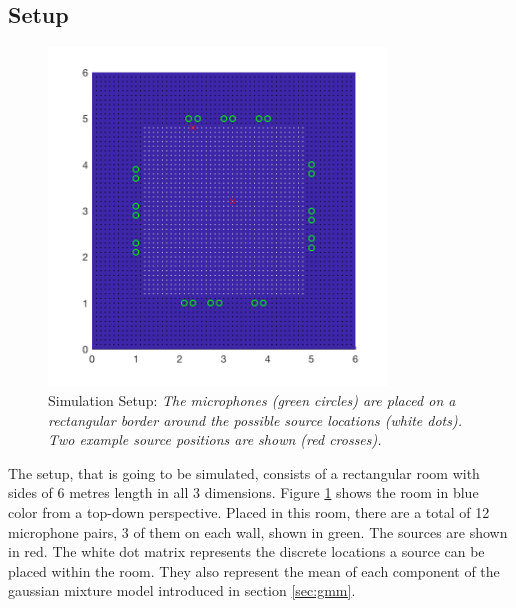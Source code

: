 \subsection{Setup}
\label{sec:setup}

\begin{figure}[H]
	\centering
	\includegraphics[width=0.8\textwidth]{data/plots/setup/setup.png}
	\caption[Simulation Setup]{Simulation Setup: \itshape The microphones (green circles) are placed on a rectangular border around the possible source locations (white dots). Two example source positions are shown (red crosses).}
	\label{fig:setup}
\end{figure}


The setup, that is going to be simulated, consists of a rectangular room with sides of 6 metres length in all 3 dimensions. Figure \ref{fig:setup} shows the room in blue color from a top-down perspective. Placed in this room, there are a total of 12 microphone pairs, 3 of them on each wall, shown in green. The sources are shown in red. The white dot matrix represents the discrete locations a source can be placed within the room. They also represent the mean of each component of the gaussian mixture model introduced in section \ref{sec:gmm}.

